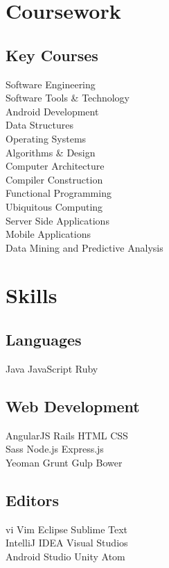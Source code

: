 \documentclass[]{deedy-resume-openfont}
\begin{document}
\begin{minipage}[t]{0.33\textwidth}
\section{Coursework}
\subsection{Key Courses}
Software Engineering \\
Software Tools \& Technology \\
Android Development \\
Data Structures \\
Operating Systems \\
Algorithms \& Design \\
Computer Architecture \\
Compiler Construction \\
Functional Programming \\
Ubiquitous Computing \\
Server Side Applications \\
Mobile Applications \\
Data Mining and Predictive Analysis
\sectionsep


\section{Skills}
\subsection{Languages}
Java \textbullet{} JavaScript \textbullet{} Ruby \\ 
\subsection{Web Development}
AngularJS \textbullet{} Rails \textbullet{} HTML \textbullet{} CSS \\
Sass \textbullet{} Node.js \textbullet{} Express.js \\
Yeoman \textbullet{} Grunt \textbullet{} Gulp \textbullet{} Bower \\
\subsection{Editors}
vi \textbullet{} Vim \textbullet{} Eclipse \textbullet{} Sublime Text \\
IntelliJ IDEA \textbullet{} Visual Studios \\
Android Studio \textbullet{} Unity \textbullet{} Atom

\end{minipage}
\end{document}
